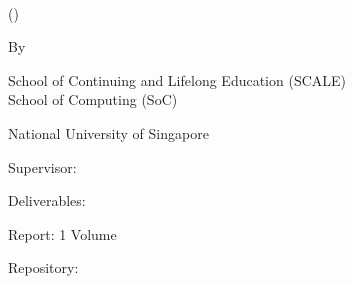\hypersetup{pageanchor=false}
\begin{titlepage}
    {\centering
    {\large \coursecode\ \coursename}
    \vfill
    {\LARGE\bfseries \projecttitle\par}
    \vspace{1cm}
    {\normalsize (\projectkind)\par}
    \vspace{1cm}
    {\large By\par \authorname\par}
    \vfill
    {\normalsize \programme\par
    {School of Continuing and Lifelong Education (SCALE)\\
    School of Computing (SoC)\par}
    National University of Singapore\par}
    \vspace{1cm}
    {\normalsize \academicyear\par}
    }
    \vspace{1cm}
    Supervisor: \advisorname \par
    \vspace{1cm}
    Deliverables: \par
    \begin{list}{\quad}{}
        \item Report: 1 Volume
        \item Repository: \repolink
    \end{list}
\end{titlepage}
\hypersetup{pageanchor=true}
\restoregeometry
\pagebreak
